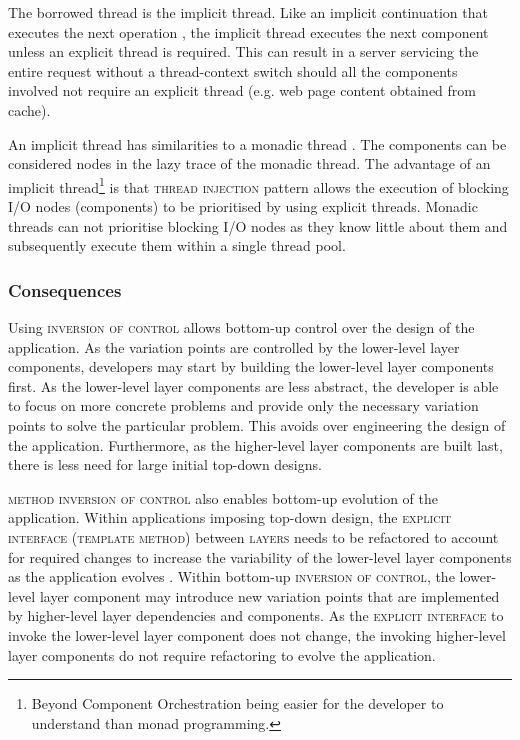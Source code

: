 \documentclass[prodmode]{style/acmlarge}
\begin{document}
The borrowed thread is the implicit thread.  Like an implicit continuation that
executes the next operation \cite{continuations}, the implicit thread executes
the next component unless an explicit thread is required.  This can result in
a server servicing the entire request without a thread-context switch
should all the components involved not require an explicit thread
(e.g. web page content obtained from cache).

An implicit thread has similarities to a monadic thread \cite{monadic-thread}.
The components can be considered nodes in the lazy trace of the monadic thread.
The advantage of an implicit thread\footnote{Beyond Component Orchestration
being easier for the developer to understand than monad programming.} is that
\textsc{thread injection} pattern allows the execution of blocking I/O nodes
(components) to be prioritised by using explicit threads.  Monadic threads can
not prioritise blocking I/O nodes as they know little about them and
subsequently execute them within a single thread pool.


\subsubsection*{Consequences}

Using \textsc{inversion of control} allows bottom-up control over the design of
the application.  As the variation points are controlled by the lower-level
layer components, developers may start by building the lower-level layer
components first.  As the lower-level layer components are less abstract, the
developer is able to focus on more concrete problems and provide only the
necessary variation points to solve the particular problem.  This avoids over
engineering the design of the application.  Furthermore, as the higher-level
layer components are built last, there is less need for large initial top-down
designs.

\textsc{method inversion of control} also enables bottom-up evolution of the
application.  Within applications imposing top-down design, the
\textsc{explicit interface} (\textsc{template method}) between \textsc{layers}
needs to be refactored to account for required changes to increase the
variability of the lower-level layer components as the application evolves
\cite{ioc}.  Within bottom-up \textsc{inversion of control}, the lower-level
layer component may introduce new variation points that are implemented by
higher-level layer dependencies and components.  As the \textsc{explicit
interface} to invoke the lower-level layer component does not change, the
invoking higher-level layer components do not require refactoring to evolve the
application.
\end{document}
